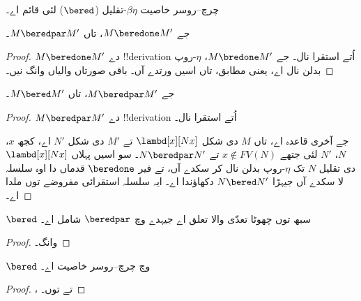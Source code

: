 \documentclass[../../../include/open-logic-section]{subfiles}
\begin{document}


چرچ–روسر خاصیت $\beta\eta$-تقلیل ($\bered$) لئی قائم اے۔

\begin{lem}
  جے $M \beredone M'$، تاں $M \beredpar M'$۔
\end{lem}

\begin{proof}
  $M \beredone M'$ دے !!{derivation} اُتے استقرا نال۔ جے $M \bredone
  M'$، $\eta$-روپ بدلن نال اے، یعنی 
  مطابق، تاں اسیں  ورتدے آں۔ باقی صورتاں
   والیاں وانگ نیں۔
\end{proof}

\begin{lem}
  جے $M \beredpar M'$، تاں $M \bered M'$۔
\end{lem}

\begin{proof} $M \beredpar M'$ دے !!{derivation} اُتے استقرا نال۔

  جے آخری قاعدہ  اے، تاں $M$
  دی شکل $\lambd[x][Nx]$ تے $M'$ دی شکل $N'$ اے، کجھ $x$،
  $N$، $N'$ لئی جتھے $x
  \notin FV(N)$ تے $N \beredpar N'$۔ سو اسیں پہلاں
  $\lambd[x][Nx]$ دی تقلیل $N$ تک $\eta$-روپ بدلن نال
  کر سکدے آں، تے فیر $\beredone$ قدماں دا اوہ سلسلہ لا سکدے
  آں جیہڑا $N \bered N'$ دکھاؤندا اے۔ ایہ سلسلہ استقرائی مفروضے
  توں ملدا اے۔
\end{proof}

\begin{lem}
  $\bered$ سبھ توں چھوٹا تعدّی والا تعلق اے جیہدے وچ $\beredpar$ شامل اے۔
\end{lem}

\begin{proof}
   وانگ۔
\end{proof}

\begin{thm}
  $\bered$ وچ چرچ–روسر خاصیت اے۔
\end{thm}

\begin{proof}
  ،  تے  توں۔
\end{proof}
\end{document}
